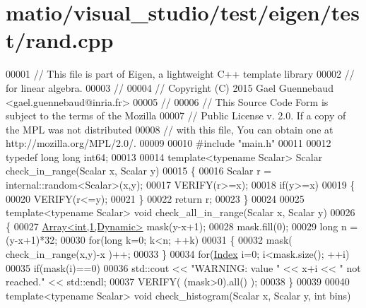\hypertarget{matio_2visual__studio_2test_2eigen_2test_2rand_8cpp_source}{}\section{matio/visual\+\_\+studio/test/eigen/test/rand.cpp}
\label{matio_2visual__studio_2test_2eigen_2test_2rand_8cpp_source}

\begin{DoxyCode}
00001 \textcolor{comment}{// This file is part of Eigen, a lightweight C++ template library}
00002 \textcolor{comment}{// for linear algebra.}
00003 \textcolor{comment}{//}
00004 \textcolor{comment}{// Copyright (C) 2015 Gael Guennebaud <gael.guennebaud@inria.fr>}
00005 \textcolor{comment}{//}
00006 \textcolor{comment}{// This Source Code Form is subject to the terms of the Mozilla}
00007 \textcolor{comment}{// Public License v. 2.0. If a copy of the MPL was not distributed}
00008 \textcolor{comment}{// with this file, You can obtain one at http://mozilla.org/MPL/2.0/.}
00009 
00010 \textcolor{preprocessor}{#include "main.h"}
00011 
00012 \textcolor{keyword}{typedef} \textcolor{keywordtype}{long} \textcolor{keywordtype}{long} int64;
00013 
00014 \textcolor{keyword}{template}<\textcolor{keyword}{typename} Scalar> Scalar check\_in\_range(Scalar x, Scalar y)
00015 \{
00016   Scalar r = internal::random<Scalar>(x,y);
00017   VERIFY(r>=x);
00018   \textcolor{keywordflow}{if}(y>=x)
00019   \{
00020     VERIFY(r<=y);
00021   \}
00022   \textcolor{keywordflow}{return} r;
00023 \}
00024 
00025 \textcolor{keyword}{template}<\textcolor{keyword}{typename} Scalar> \textcolor{keywordtype}{void} check\_all\_in\_range(Scalar x, Scalar y)
00026 \{
00027   \hyperlink{group___core___module_class_eigen_1_1_array}{Array<int,1,Dynamic>} mask(y-x+1);
00028   mask.fill(0);
00029   \textcolor{keywordtype}{long} n = (y-x+1)*32;
00030   \textcolor{keywordflow}{for}(\textcolor{keywordtype}{long} k=0; k<n; ++k)
00031   \{
00032     mask( check\_in\_range(x,y)-x )++;
00033   \}
00034   \textcolor{keywordflow}{for}(\hyperlink{namespace_eigen_a62e77e0933482dafde8fe197d9a2cfde}{Index} i=0; i<mask.size(); ++i)
00035     \textcolor{keywordflow}{if}(mask(i)==0)
00036       std::cout << \textcolor{stringliteral}{"WARNING: value "} << x+i << \textcolor{stringliteral}{" not reached."} << std::endl;
00037   VERIFY( (mask>0).all() );
00038 \}
00039 
00040 \textcolor{keyword}{template}<\textcolor{keyword}{typename} Scalar> \textcolor{keywordtype}{void} check\_histogram(Scalar x, Scalar y, \textcolor{keywordtype}{int} bins)

\end{DoxyCode}
